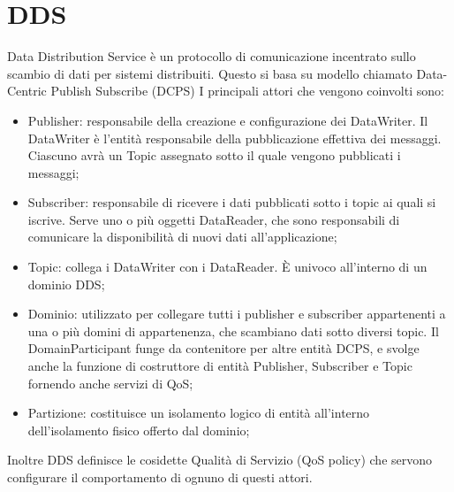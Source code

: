 \section{DDS}
Data Distribution Service è un protocollo di comunicazione incentrato sullo scambio di dati per sistemi distribuiti. Questo si basa su modello chiamato Data-Centric Publish Subscribe (DCPS) I principali attori che vengono coinvolti sono:
\begin{itemize}
    \item Publisher: responsabile della creazione e configurazione dei DataWriter. Il DataWriter è l'entità responsabile della pubblicazione effettiva dei messaggi. Ciascuno avrà un Topic assegnato sotto il quale vengono pubblicati i messaggi;\label{actor:publisher}

    \item Subscriber: responsabile di ricevere i dati pubblicati sotto i topic ai quali si iscrive. Serve uno o più oggetti DataReader, che sono responsabili di comunicare la disponibilità di nuovi dati all'applicazione;\label{actor:subscriber}

    \item Topic: collega i DataWriter con i DataReader. È univoco all'interno di un dominio DDS;\@
    
    \item Dominio: utilizzato per collegare tutti i publisher e subscriber appartenenti a una o più domini di appartenenza, che scambiano dati sotto diversi topic. Il DomainParticipant funge da contenitore per altre entità DCPS, e svolge anche la funzione di costruttore di entità Publisher, Subscriber e Topic fornendo anche servizi di QoS;\@

    \item Partizione: costituisce un isolamento logico di entità all'interno dell'isolamento fisico offerto dal dominio;

\end{itemize}
Inoltre DDS definisce le cosidette Qualità di Servizio (QoS policy) che servono configurare il comportamento di ognuno di questi attori.



